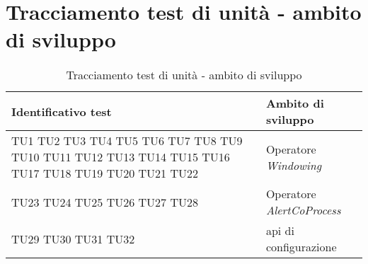 \section{Tracciamento test di unità - ambito di sviluppo}
{
\centering
\begin{longtable}{L{5cm} L{8.5cm}}
\caption{Tracciamento test di unità - ambito di sviluppo}\\
\textbf{Identificativo test} &
\textbf{Ambito di sviluppo}\\
\endhead
\hline

TU1 \newline TU2 \newline TU3 \newline TU4 \newline TU5 \newline TU6 \newline TU7 \newline TU8 \newline TU9 \newline TU10 \newline TU11 \newline TU12 \newline TU13 \newline TU14 \newline TU15 \newline TU16 \newline TU17 \newline TU18 \newline TU19 \newline TU20 \newline TU21 \newline TU22 & Operatore \textit{Windowing} \\
\hline
TU23 \newline TU24 \newline TU25 \newline TU26 \newline TU27 \newline TU28 & Operatore \textit{AlertCoProcess} \\
\hline
TU29 \newline TU30 \newline TU31 \newline TU32 & \gls{api} di configurazione\\
\hline
\end{longtable}
}


